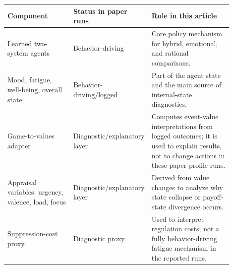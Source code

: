 \begin{tabular}{p{0.30\linewidth}p{0.23\linewidth}p{0.37\linewidth}}
\toprule
Component & Status in paper runs & Role in this article \\
\midrule
Learned two-system agents & Behavior-driving & Core policy mechanism for hybrid, emotional, and rational comparisons. \\
Mood, fatigue, well-being, overall state & Behavior-driving/logged & Part of the agent state and the main source of internal-state diagnostics. \\
Game-to-values adapter & Diagnostic/explanatory layer & Computes event-value interpretations from logged outcomes; it is used to explain results, not to change actions in these paper-profile runs. \\
Appraisal variables: urgency, valence, load, focus & Diagnostic/explanatory layer & Derived from value changes to analyze why state collapse or payoff-state divergence occurs. \\
Suppression-cost proxy & Diagnostic proxy & Used to interpret regulation costs; not a fully behavior-driving fatigue mechanism in the reported runs. \\
\bottomrule
\end{tabular}
